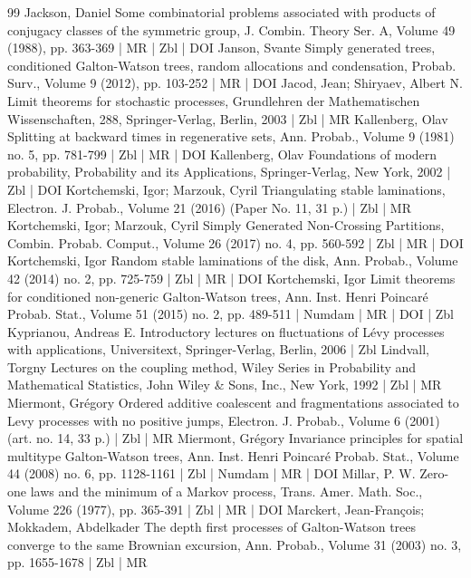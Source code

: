 \documentclass[10pt]{amsart}
\theoremstyle{definition}\newtheorem{defi}[theo]{Definition}\newtheorem{rema}[theo]{Remark}\newtheorem{exam}[theo]{Example}\newtheorem{exem}[theo]{Example}\newtheorem{nota}[theo]{Notation}
\begin{document}
\begin{thebibliography}{99}
Jackson, Daniel Some combinatorial problems associated with products of conjugacy classes of the symmetric group, J. Combin. Theory Ser. A, Volume 49 (1988), pp. 363-369 | MR | Zbl | DOI
Janson, Svante Simply generated trees, conditioned Galton-Watson trees, random allocations and condensation, Probab. Surv., Volume 9 (2012), pp. 103-252 | MR | DOI
Jacod, Jean; Shiryaev, Albert N. Limit theorems for stochastic processes, Grundlehren der Mathematischen Wissenschaften, 288, Springer-Verlag, Berlin, 2003 | Zbl | MR
Kallenberg, Olav Splitting at backward times in regenerative sets, Ann. Probab., Volume 9 (1981) no. 5, pp. 781-799 | Zbl | MR | DOI
Kallenberg, Olav Foundations of modern probability, Probability and its Applications, Springer-Verlag, New York, 2002 | Zbl | DOI
Kortchemski, Igor; Marzouk, Cyril Triangulating stable laminations, Electron. J. Probab., Volume 21 (2016) (Paper No. 11, 31 p.) | Zbl | MR
Kortchemski, Igor; Marzouk, Cyril Simply Generated Non-Crossing Partitions, Combin. Probab. Comput., Volume 26 (2017) no. 4, pp. 560-592 | Zbl | MR | DOI
Kortchemski, Igor Random stable laminations of the disk, Ann. Probab., Volume 42 (2014) no. 2, pp. 725-759 | Zbl | MR | DOI
Kortchemski, Igor Limit theorems for conditioned non-generic Galton-Watson trees, Ann. Inst. Henri Poincaré Probab. Stat., Volume 51 (2015) no. 2, pp. 489-511 | Numdam | MR | DOI | Zbl
Kyprianou, Andreas E. Introductory lectures on fluctuations of Lévy processes with applications, Universitext, Springer-Verlag, Berlin, 2006 | Zbl
Lindvall, Torgny Lectures on the coupling method, Wiley Series in Probability and Mathematical Statistics, John Wiley \& Sons, Inc., New York, 1992 | Zbl | MR
Miermont, Grégory Ordered additive coalescent and fragmentations associated to Levy processes with no positive jumps, Electron. J. Probab., Volume 6 (2001) (art. no. 14, 33 p.) | Zbl | MR
Miermont, Grégory Invariance principles for spatial multitype Galton-Watson trees, Ann. Inst. Henri Poincaré Probab. Stat., Volume 44 (2008) no. 6, pp. 1128-1161 | Zbl | Numdam | MR | DOI
Millar, P. W. Zero-one laws and the minimum of a Markov process, Trans. Amer. Math. Soc., Volume 226 (1977), pp. 365-391 | Zbl | MR | DOI
Marckert, Jean-François; Mokkadem, Abdelkader The depth first processes of Galton-Watson trees converge to the same Brownian excursion, Ann. Probab., Volume 31 (2003) no. 3, pp. 1655-1678 | Zbl | MR

\end{thebibliography}
\end{document}
